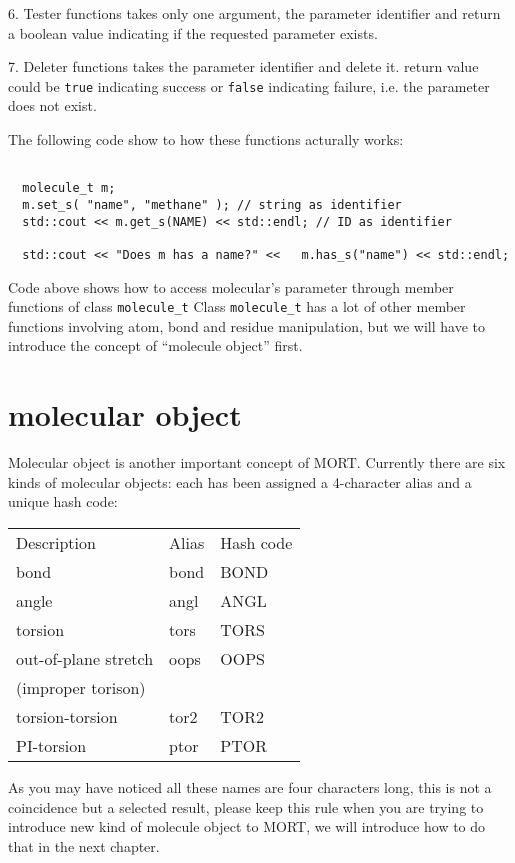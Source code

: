 \documentclass[letterpaper]{book}
\begin{document}
  6. Tester functions takes only one argument, the parameter identifier and return a boolean
value indicating if the requested parameter exists.

  7. Deleter functions takes the parameter identifier and delete it. return value could be
\lstinline$true$ indicating success or \lstinline$false$ indicating failure, i.e. the parameter
does not exist.

  The following code show to how these functions acturally works:

\begin{lstlisting}

  molecule_t m;
  m.set_s( "name", "methane" ); // string as identifier
  std::cout << m.get_s(NAME) << std::endl; // ID as identifier

  std::cout << "Does m has a name?" <<   m.has_s("name") << std::endl;

\end{lstlisting}
  
  Code above shows how to access molecular's parameter through member functions of class \lstinline$molecule_t$
Class \lstinline$molecule_t$ has a lot of other member functions involving atom, bond and residue manipulation,
but we will have to introduce the concept of ``molecule object'' first.

\section{molecular object}

  Molecular object is another important concept of MORT.  Currently there are six kinds of molecular objects:
each has been assigned a 4-character alias and a unique hash code:

\begin{tabular}{lll}

Description		& Alias		& Hash code	\\
bond			& bond		& BOND		\\
angle			& angl		& ANGL		\\
torsion			& tors		& TORS		\\
out-of-plane stretch	& oops		& OOPS		\\
(improper torison)	&		&		\\
torsion-torsion		& tor2		& TOR2		\\
PI-torsion		& ptor		& PTOR

\end{tabular}

  As you may have noticed all these names are four characters long, this is not a coincidence but a selected
result, please keep this rule when you are trying to introduce new kind of molecule object to MORT, we will
introduce how to do that in the next chapter.
\end{document}
